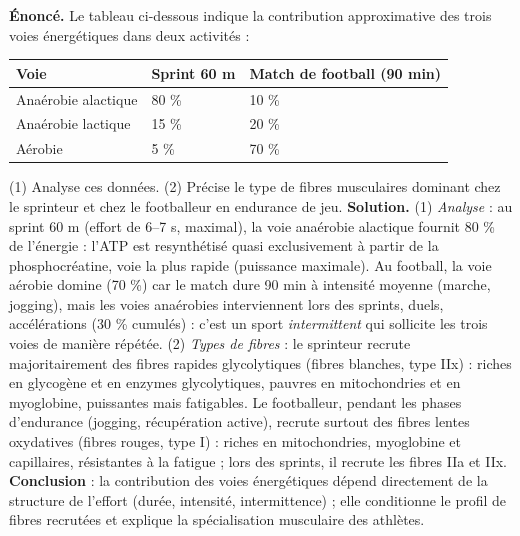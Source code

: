 \documentclass[11pt]{article}
\newcommand{\cle}[1]{{\popxbold\color{popdark}#1}}
\begin{document}
\begin{exoresolu}
\textbf{Énoncé.} Le tableau ci-dessous indique la contribution approximative des trois voies énergétiques dans deux activités :
\begin{center}
\begin{tabularx}{\linewidth}{|l|X|X|}\hline
\rowcolor{popblueL} Voie & Sprint 60 m & Match de football (90 min) \\ \hline
Anaérobie alactique & 80 \% & 10 \% \\ \hline
Anaérobie lactique & 15 \% & 20 \% \\ \hline
Aérobie & 5 \% & 70 \% \\ \hline
\end{tabularx}
\end{center}
(1) Analyse ces données. (2) Précise le type de fibres musculaires dominant chez le sprinteur et chez le footballeur en endurance de jeu.
\tcblower
\textbf{Solution.}
(1) \emph{Analyse} : au sprint 60 m (effort de 6--7 s, maximal), la voie anaérobie alactique fournit 80 \% de l'énergie : l'ATP est resynthétisé quasi exclusivement à partir de la phosphocréatine, voie la plus rapide (puissance maximale). Au football, la voie aérobie domine (70 \%) car le match dure 90 min à intensité moyenne (marche, jogging), mais les voies anaérobies interviennent lors des sprints, duels, accélérations (30 \% cumulés) : c'est un sport \emph{intermittent} qui sollicite les trois voies de manière répétée.
(2) \emph{Types de fibres} : le sprinteur recrute majoritairement des fibres \cle{rapides glycolytiques} (fibres blanches, type IIx) : riches en glycogène et en enzymes glycolytiques, pauvres en mitochondries et en myoglobine, puissantes mais fatigables. Le footballeur, pendant les phases d'endurance (jogging, récupération active), recrute surtout des fibres \cle{lentes oxydatives} (fibres rouges, type I) : riches en mitochondries, myoglobine et capillaires, résistantes à la fatigue ; lors des sprints, il recrute les fibres IIa et IIx. \textbf{Conclusion} : la contribution des voies énergétiques dépend directement de la structure de l'effort (durée, intensité, intermittence) ; elle conditionne le profil de fibres recrutées et explique la spécialisation musculaire des athlètes.
\end{exoresolu}
\end{document}
